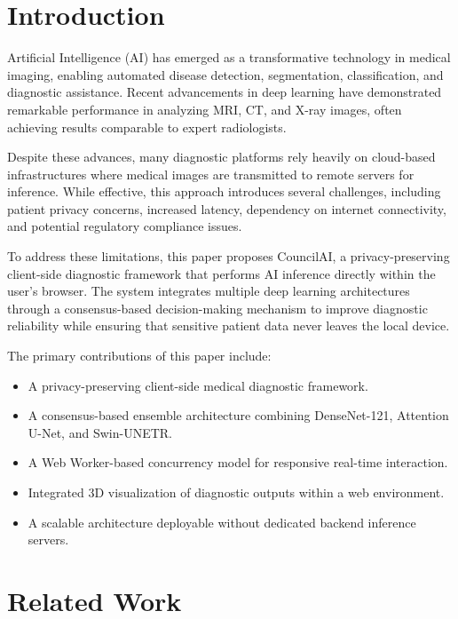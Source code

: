 \documentclass[journal]{IEEEtran}
\begin{document}
\section{Introduction}

Artificial Intelligence (AI) has emerged as a transformative technology in medical imaging, enabling automated disease detection, segmentation, classification, and diagnostic assistance. Recent advancements in deep learning have demonstrated remarkable performance in analyzing MRI, CT, and X-ray images, often achieving results comparable to expert radiologists.

Despite these advances, many diagnostic platforms rely heavily on cloud-based infrastructures where medical images are transmitted to remote servers for inference. While effective, this approach introduces several challenges, including patient privacy concerns, increased latency, dependency on internet connectivity, and potential regulatory compliance issues.

To address these limitations, this paper proposes CouncilAI, a privacy-preserving client-side diagnostic framework that performs AI inference directly within the user's browser. The system integrates multiple deep learning architectures through a consensus-based decision-making mechanism to improve diagnostic reliability while ensuring that sensitive patient data never leaves the local device.

The primary contributions of this paper include:

\begin{itemize}
    \item A privacy-preserving client-side medical diagnostic framework.
    \item A consensus-based ensemble architecture combining DenseNet-121, Attention U-Net, and Swin-UNETR.
    \item A Web Worker-based concurrency model for responsive real-time interaction.
    \item Integrated 3D visualization of diagnostic outputs within a web environment.
    \item A scalable architecture deployable without dedicated backend inference servers.
\end{itemize}

\section{Related Work}
\end{document}

